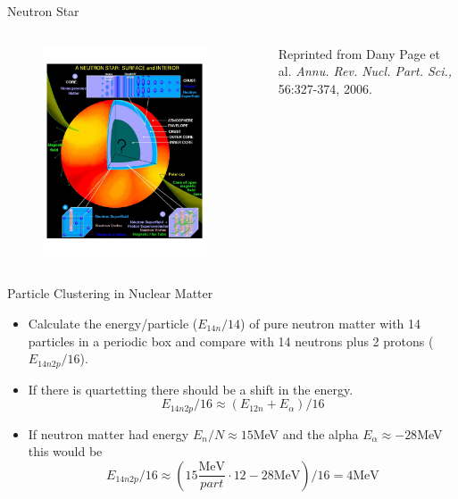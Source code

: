 \documentclass{beamer}
\begin{document}
\begin{frame}{Neutron Star}
\begin{columns}
\begin{column}{0.55\textwidth}
\begin{figure}
   \includegraphics[width=0.9\textwidth]{figures/neutronstar.png}
\end{figure}
\end{column}
\begin{column}{0.4\textwidth}
   {\color{blue}{Figure:}} Reprinted from Dany Page et al. \textit{Annu. Rev. Nucl. Part. Sci.,} 56:327-374, 2006.
\end{column}
\end{columns}
\end{frame}

\begin{frame}{Particle Clustering in Nuclear Matter}
\begin{itemize}
   \item Calculate the energy/particle ($E_{14n}/14$) of pure neutron matter with 14 particles in a periodic box and compare with 14 neutrons plus 2 protons ($E_{14n2p}/16$).
   \item If there is quartetting there should be a shift in the energy.
   \begin{equation*}
      E_{14n2p}/16 \approx (E_{12n}+E_{\alpha})/16
   \end{equation*}
   \item If neutron matter had energy $E_n/N \approx 15$MeV and the alpha $E_\alpha \approx -28$MeV this would be
   \begin{equation*}
      E_{14n2p}/16 \approx \left(15\frac{\mathrm{MeV}}{part}\cdot12-28\mathrm{MeV}\right)/16 = 4 \mathrm{MeV}
   \end{equation*}
\end{itemize}
\end{frame}
\end{document}
